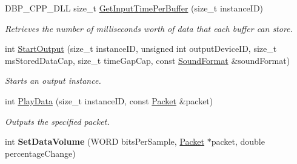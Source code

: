 \begin{DoxyCompactItemize}
DBP\_\-CPP\_\-DLL size\_\-t \hyperlink{namespacemn_sound_a6c336c93f373f5164ce3f8f14acda4fd}{GetInputTimePerBuffer} (size\_\-t instanceID)
\begin{DoxyCompactList}\small\item\em Retrieves the number of milliseconds worth of data that each buffer can store. \item\end{DoxyCompactList}\item 
int \hyperlink{namespacemn_sound_a3cb5bc255f34cecb9d8601577d15d678}{StartOutput} (size\_\-t instanceID, unsigned int outputDeviceID, size\_\-t msStoredDataCap, size\_\-t timeGapCap, const \hyperlink{class_sound_format}{SoundFormat} \&soundFormat)
\begin{DoxyCompactList}\small\item\em Starts an output instance. \item\end{DoxyCompactList}\item 
int \hyperlink{namespacemn_sound_ae340906f8e3f2b9f286f43a374612131}{PlayData} (size\_\-t instanceID, const \hyperlink{class_packet}{Packet} \&packet)
\begin{DoxyCompactList}\small\item\em Outputs the specified packet. \item\end{DoxyCompactList}\item 
\hypertarget{namespacemn_sound_a8161025e25d4bb7d63cd8b62f6fcf68a}{
int {\bfseries SetDataVolume} (WORD bitsPerSample, \hyperlink{class_packet}{Packet} $\ast$packet, double percentageChange)}
\label{namespacemn_sound_a8161025e25d4bb7d63cd8b62f6fcf68a}


\end{DoxyCompactItemize}
